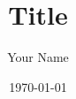 
\makeatletter
\def\thickhrulefill{\leavevmode \leaders \hrule height 1pt\hfill \kern \z@}
\def\maketitle{%
    \begin{flushright}
        \normalfont\@date
    \end{flushright}
    \null
    \thispagestyle{empty}%
    \vskip 3cm
    \vfil
    \hrule height 2pt
    \par
    \begin{center}
        \huge \strut \@title \par
    \end{center}
    \hrule height 2pt
    \par
    \vfil
    \vskip 2cm
    \begin{center}
        \normalfont\LARGE\@author
    \end{center}
    \null
    \cleardoublepage
}
\makeatother

\title{Title}
\author{Your Name}
\date{\today}